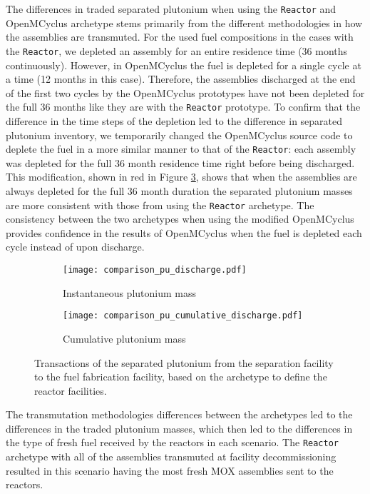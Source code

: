The differences in traded separated plutonium when using the \Cycamore 
\texttt{Reactor} and OpenMCyclus archetype stems 
primarily from the different methodologies in how the assemblies 
are transmuted. For the used fuel compositions in the cases with the \Cycamore 
\texttt{Reactor}, we depleted an assembly for an entire residence time 
(36 months continuously). However, in OpenMCyclus the fuel is depleted for 
a single cycle at a time (12 months in this case). Therefore, the 
assemblies discharged at the end of the first two cycles by the 
OpenMCyclus prototypes have not been depleted for the full 36 months 
like they are with the \Cycamore \texttt{Reactor} prototype. To confirm  
that the difference in the time steps of the depletion led to the 
difference in separated plutonium inventory, we temporarily changed
the OpenMCyclus source code to deplete the fuel in a more similar 
manner to that of the \Cycamore \texttt{Reactor}: each assembly was 
depleted for the full 36 month residence time right before being 
discharged. This modification, shown in red in Figure 
\ref{fig:comparison_pu_discharge}, shows that when the assemblies 
are always depleted for the full 36 month duration the 
separated plutonium masses are more consistent with those from 
using the \Cycamore \texttt{Reactor} archetype. The consistency 
between the two archetypes when using the modified OpenMCyclus 
provides confidence in the results of OpenMCyclus when the fuel 
is depleted each cycle instead of upon discharge. 
\Cycamore

\begin{figure}[ht!]
    \centering
    \begin{subfigure}[b]{0.48\textwidth}
        \centering
        \texttt{[image: comparison\_pu\_discharge.pdf]}
        \caption{Instantaneous plutonium mass}
        \label{fig:comparison_pu_inst_discharge}
    \end{subfigure}
    \hfill
    \begin{subfigure}[b]{0.48\textwidth}
        \centering
        \texttt{[image: comparison\_pu\_cumulative\_discharge.pdf]}
        \caption{Cumulative plutonium mass}
        \label{fig:comparison_pu_cumulative_discharge}
    \end{subfigure}
       \caption{Transactions of the separated plutonium from the
       separation facility to the fuel fabrication facility, based 
       on the archetype to define the reactor facilities.}
       \label{fig:comparison_pu_discharge}
\end{figure}

The transmutation methodologies differences between the archetypes 
led to the differences in the traded plutonium masses, which then 
led to the differences in the type of fresh fuel received by 
the reactors in each scenario. The \Cycamore \texttt{Reactor}
archetype with all of the assemblies transmuted at facility 
decommissioning resulted in this scenario having the most 
fresh \gls{MOX} assemblies sent to the reactors.
